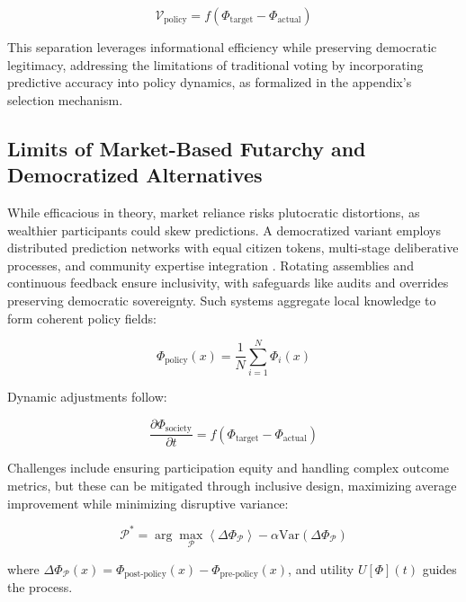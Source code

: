 \documentclass[11pt]{article}
\begin{document}
\begin{equation}
\mathcal{V}_{\text{policy}} = f(\Phi_{\text{target}} - \Phi_{\text{actual}})
\end{equation}

This separation leverages informational efficiency while preserving democratic legitimacy, addressing the limitations of traditional voting by incorporating predictive accuracy into policy dynamics, as formalized in the appendix's selection mechanism.

\subsection{Limits of Market-Based Futarchy and Democratized Alternatives}

While efficacious in theory, market reliance risks plutocratic distortions, as wealthier participants could skew predictions. A democratized variant employs distributed prediction networks with equal citizen tokens, multi-stage deliberative processes, and community expertise integration \citep{landemore2020open, fishkin2018democracy}. Rotating assemblies and continuous feedback ensure inclusivity, with safeguards like audits and overrides preserving democratic sovereignty. Such systems aggregate local knowledge to form coherent policy fields:

\begin{equation}
\Phi_{\text{policy}}(x) = \frac{1}{N} \sum_{i=1}^N \Phi_i(x)
\end{equation}

Dynamic adjustments follow:

\begin{equation}
\frac{\partial \Phi_{\text{society}}}{\partial t} = f(\Phi_{\text{target}} - \Phi_{\text{actual}})
\end{equation}

Challenges include ensuring participation equity and handling complex outcome metrics, but these can be mitigated through inclusive design, maximizing average improvement while minimizing disruptive variance:

\begin{equation}
\mathcal{P}^* = \arg \max_{\mathcal{P}} \left\langle \Delta \Phi_{\mathcal{P}} \right\rangle - \alpha \text{Var}(\Delta \Phi_{\mathcal{P}})
\end{equation}

where $\Delta \Phi_{\mathcal{P}}(x) = \Phi_{\text{post-policy}}(x) - \Phi_{\text{pre-policy}}(x)$, and utility $U[\Phi](t)$ guides the process.
\end{document}

